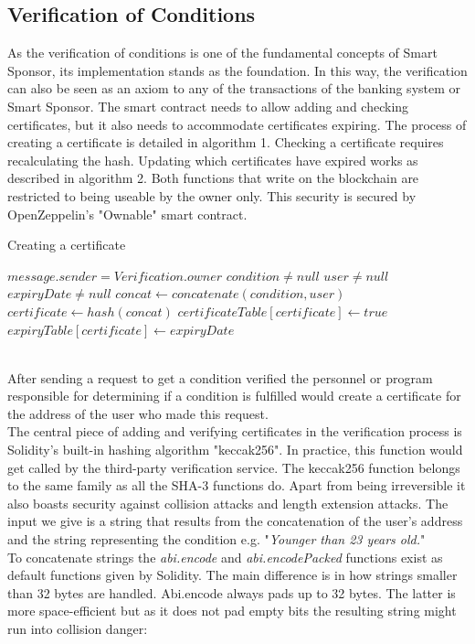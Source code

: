 \subsection{Verification of Conditions}
As the verification of conditions is one of the fundamental concepts of Smart Sponsor, its implementation stands as the foundation. In this way, the verification can also be seen as an axiom to any of the transactions of the banking system or Smart Sponsor. The smart contract needs to allow adding and checking certificates, but it also needs to accommodate certificates expiring. The process of creating a certificate is detailed in algorithm 1. Checking a certificate requires recalculating the hash. Updating which certificates have expired works as described in algorithm 2. Both functions that write on the blockchain are restricted to being useable by the owner only. This security is secured by OpenZeppelin's "Ownable" smart contract\cite{Zeppelin}.\\
\begin{algorithm}
\caption{Creating a certificate}\label{alg:create}
\begin{algorithmic}
\Require $message.sender = Verification.owner$
\Require $condition \neq null$
\Require $user \neq null$
\Require $expiryDate \neq null$
\State $concat \gets concatenate(condition, user)$ 
\State $certificate \gets hash(concat)$
    \State $certificateTable[certificate] \gets true $
\EndIf
\State $expiryTable[certificate] \gets expiryDate$
\end{algorithmic}
\end{algorithm}
\\
After sending a request to get a condition verified the personnel or program responsible for determining if a condition is fulfilled would create a certificate for the address of the user who made this request.\\
The central piece of adding and verifying certificates in the verification process is Solidity's built-in hashing algorithm "keccak256". In practice, this function would get called by the third-party verification service. The keccak256 function belongs to the same family as all the SHA-3 functions do. Apart from being irreversible it also boasts security against collision attacks and length extension attacks. The input we give is a string that results from the concatenation of the user's address and the string representing the condition e.g. "\emph{Younger than 23 years old.}"\\
To concatenate strings the \emph{abi.encode} and \emph{abi.encodePacked} functions exist as default functions given by Solidity. The main difference is in how strings smaller than 32 bytes are handled. Abi.encode always pads up to 32 bytes. The latter is more space-efficient but as it does not pad empty bits the resulting string might run into collision danger:
